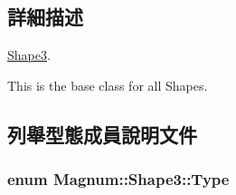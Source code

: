 \subsection{詳細描述}
\hyperlink{class_magnum_1_1_shape3}{Shape3}. 

This is the base class for all Shapes. 

\subsection{列舉型態成員說明文件}
\subsubsection[{\texorpdfstring{Type}{Type}}]{\setlength{\rightskip}{0pt plus 5cm}enum {\bf Magnum\+::\+Shape3\+::\+Type}}\hypertarget{class_magnum_1_1_shape3_ae6ddcdad31136c099bc210b3f6399ffb}{}\label{class_magnum_1_1_shape3_ae6ddcdad31136c099bc210b3f6399ffb}
